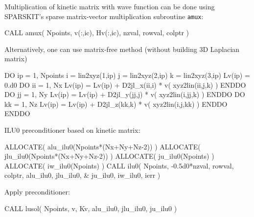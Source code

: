 Multiplication of kinetic matrix with wave function can be done using
SPARSKIT's sparse matrix-vector multiplication subroutine {\tt amux}:
\begin{fortrancode}
CALL amux( Npoints, v(:,ic), Hv(:,ic), nzval, rowval, colptr )
\end{fortrancode}

Alternatively, one can use matrix-free method (without building
3D Laplacian matrix)
\begin{fortrancode}
DO ip = 1, Npoints
  i = lin2xyz(1,ip)
  j = lin2xyz(2,ip)
  k = lin2xyz(3,ip)
  Lv(ip) = 0.d0
  DO ii = 1, Nx
    Lv(ip) = Lv(ip) + D2jl_x(ii,i) * v( xyz2lin(ii,j,k) )
  ENDDO
  DO jj = 1, Ny
    Lv(ip) = Lv(ip) + D2jl_y(jj,j) * v( xyz2lin(i,jj,k) )
  ENDDO
  DO kk = 1, Nz
    Lv(ip) = Lv(ip) + D2jl_z(kk,k) * v( xyz2lin(i,j,kk) )
  ENDDO
ENDDO
\end{fortrancode}

ILU0 preconditioner based on kinetic matrix:
\begin{fortrancode}
ALLOCATE( alu_ilu0(Npoints*(Nx+Ny+Nz-2)) )
ALLOCATE( jlu_ilu0(Npoints*(Nx+Ny+Nz-2)) )
ALLOCATE( ju_ilu0(Npoints) )
ALLOCATE( iw_ilu0(Npoints) )
CALL ilu0( Npoints, -0.5d0*nzval, rowval, colptr, alu_ilu0, jlu_ilu0, &
           ju_ilu0, iw_ilu0, ierr )
\end{fortrancode}

Apply preconditioner:
\begin{fortrancode}
CALL lusol( Npoints, v, Kv, alu_ilu0, jlu_ilu0, ju_ilu0 )
\end{fortrancode}



